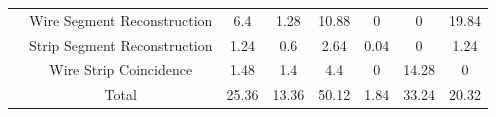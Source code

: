 \begin{table}[]
\begin{tabular}{|c|c|c|c|c|c|c|c|}
                                                                                & Wire Segment Reconstruction  & 6.4                                                       & 1.28                                                      & 10.88                                                    & 0                                                                 & 0                                                      & 19.84                                                  \\ \cline{2-8} 
                                                                                & Strip Segment Reconstruction & 1.24                                                      & 0.6                                                       & 2.64                                                     & 0.04                                                              & 0                                                      & 1.24                                                   \\ \cline{2-8} 
                                                                                & Wire Strip Coincidence       & 1.48                                                      & 1.4                                                       & 4.4                                                      & 0                                                                 & 14.28                                                  & 0                                                      \\ \cline{2-8} 
                                                                                & Total                        & 25.36                                                     & 13.36                                                     & 50.12                                                    & 1.84                                                              & 33.24                                                  & 20.32                                                  \\ \hline
    \end{tabular}
\end{table}